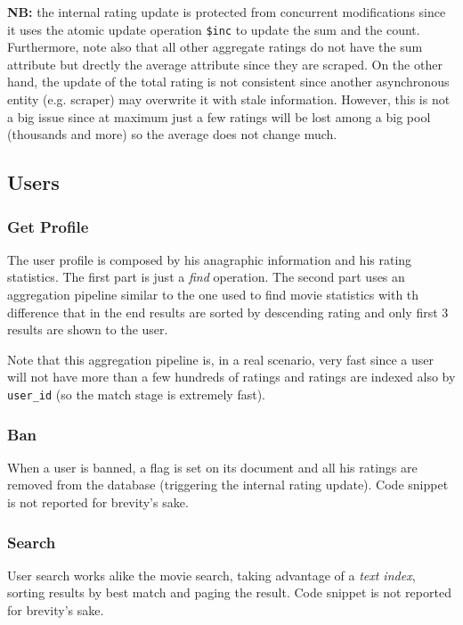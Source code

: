 \documentclass[11pt]{article}
\begin{document}
\textbf{NB: } the internal rating update is protected from concurrent modifications since it uses the atomic update operation \texttt{\$inc} to update the sum and the count. Furthermore, note also that all other aggregate ratings do not have the sum attribute but drectly the average attribute since they are scraped. On the other hand, the update of the total rating is not consistent since another asynchronous entity (e.g. scraper) may overwrite it with stale information. However, this is not a big issue since at maximum just a few ratings will be lost among a big pool (thousands and more) so the average does not change much.



\subsection{Users}
\subsubsection{Get Profile}
The user profile is composed by his anagraphic information and his rating
statistics. The first part is just a \emph{find} operation. The second part uses an aggregation pipeline similar to the one used to find movie statistics with th difference that in the end results are sorted by descending rating and only first 3 results are shown to the user.

Note that this aggregation pipeline is, in a real scenario, very fast since a user will not have more than a few hundreds of ratings and ratings are indexed also by \texttt{user\_id} (so the match stage is extremely fast).



\subsubsection{Ban}
When a user is banned, a flag is set on its document and all his ratings are removed from the database (triggering the internal rating update). Code snippet is not reported for brevity's sake.

\subsubsection{Search}
User search works alike the movie search, taking advantage of a \emph{text index}, sorting results by best match and paging the result. Code snippet is not reported for brevity's sake.
\end{document}
